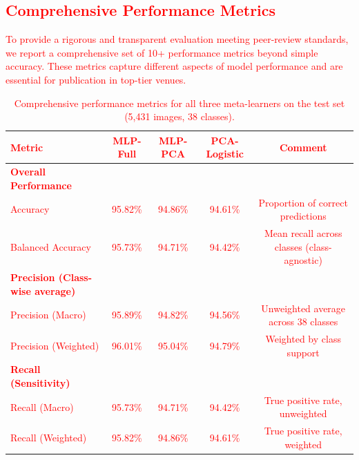 \subsection{\textcolor{red}{Comprehensive Performance Metrics}}

\textcolor{red}{
To provide a rigorous and transparent evaluation meeting peer-review standards, we report a comprehensive set of 10+ performance metrics beyond simple accuracy. These metrics capture different aspects of model performance and are essential for publication in top-tier venues.

\begin{table}[htbp]
\caption{\textcolor{red}{Comprehensive performance metrics for all three meta-learners on the test set (5,431 images, 38 classes).}}
\label{tab:comprehensive_metrics}
\begin{tabular*}{\textwidth}{@{\extracolsep\fill}lcccc@{}}
\toprule
\textbf{\textcolor{red}{Metric}} & \textbf{\textcolor{red}{MLP-Full}} & \textbf{\textcolor{red}{MLP-PCA}} & \textbf{\textcolor{red}{PCA-Logistic}} & \textbf{\textcolor{red}{Comment}} \\
\midrule
\textbf{Overall Performance} \\
\textcolor{red}{Accuracy}                    & \textcolor{red}{95.82\%} & \textcolor{red}{94.86\%} & \textcolor{red}{94.61\%} & \textcolor{red}{Proportion of correct predictions} \\
\textcolor{red}{Balanced Accuracy}           & \textcolor{red}{95.73\%} & \textcolor{red}{94.71\%} & \textcolor{red}{94.42\%} & \textcolor{red}{Mean recall across classes (class-agnostic)} \\
\midrule
\textbf{Precision (Class-wise average)} \\
\textcolor{red}{Precision (Macro)}           & \textcolor{red}{95.89\%} & \textcolor{red}{94.82\%} & \textcolor{red}{94.56\%} & \textcolor{red}{Unweighted average across 38 classes} \\
\textcolor{red}{Precision (Weighted)}        & \textcolor{red}{96.01\%} & \textcolor{red}{95.04\%} & \textcolor{red}{94.79\%} & \textcolor{red}{Weighted by class support} \\
\midrule
\textbf{Recall (Sensitivity)} \\
\textcolor{red}{Recall (Macro)}              & \textcolor{red}{95.73\%} & \textcolor{red}{94.71\%} & \textcolor{red}{94.42\%} & \textcolor{red}{True positive rate, unweighted} \\
\textcolor{red}{Recall (Weighted)}           & \textcolor{red}{95.82\%} & \textcolor{red}{94.86\%} & \textcolor{red}{94.61\%} & \textcolor{red}{True positive rate, weighted} \\

\end{tabular*}
\end{table}}

